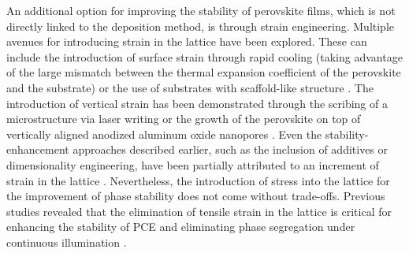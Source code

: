An additional option for improving the stability of perovskite films, which is not directly linked to the deposition method, is through strain engineering. Multiple avenues for introducing strain in the lattice have been explored. These can include the introduction of surface strain through rapid cooling (taking advantage of the large mismatch between the thermal expansion coefficient of the perovskite and the substrate) or the use of substrates with scaffold-like structure \cite{Steele2019ThermalFilms, Chakrabarti2022Scaffold-EnforcedStability}. The introduction of vertical strain has been demonstrated through the scribing of a  microstructure via laser writing or the growth of the perovskite on top of vertically aligned anodized aluminum oxide nanopores \cite{Steele2022AnFilms, Ma2019Strain-MediatedGrowth}. Even the stability-enhancement approaches described earlier, such as the inclusion of additives or dimensionality engineering, have been partially attributed to an increment of strain in the lattice \cite{Steele2021TrojansPerovskite}. Nevertheless, the introduction of stress into the lattice for the improvement of phase stability does not come without trade-offs. Previous studies revealed that the elimination of tensile strain in the lattice is critical for enhancing the stability of PCE and eliminating phase segregation under continuous illumination \cite{Rolston2018EngineeringStability, Xue2020RegulatingLayers}.

